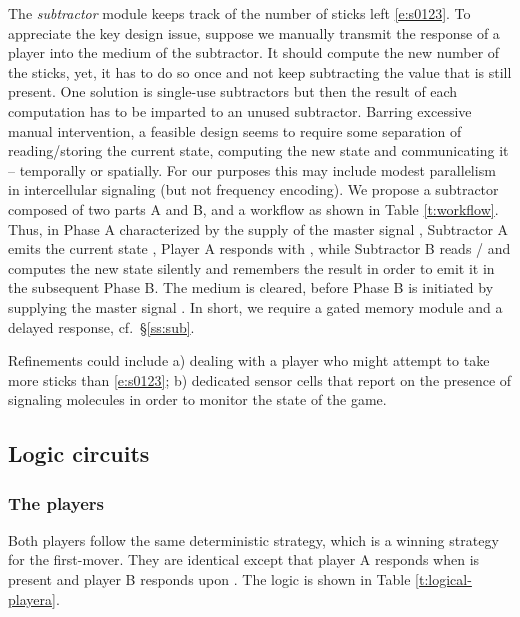 \documentclass[12pt,notitlepage]{article}
\begin{document}
The \emph{subtractor} module
keeps track of the number of sticks left \eqref{e:s0123}.
To appreciate the key design issue, suppose
we manually transmit the response 
of a player
into the medium of the subtractor.
It should compute the new number of the sticks,
yet, it has to do so once
and not keep subtracting the value 
that is still present.
One solution is single-use subtractors
but then the result of each computation
has to be imparted to an unused subtractor.
Barring excessive manual intervention,
a feasible design
seems to require some separation of
reading/storing the current state,
computing the new state and communicating it
--
temporally or spatially.
For our purposes
this may include
modest parallelism in intercellular signaling
(but not frequency encoding).
%
%
We propose 
a subtractor composed of two parts A and B,
and
a workflow 
as shown in Table \ref{t:workflow}.
%
%
%
Thus,
in Phase A characterized by the supply of 
the master signal ,
Subtractor A
emits the current state ,
Player A responds with ,
while
Subtractor B
reads /
and
computes the new state %
{silently}
and remembers the result
in order to emit it in the subsequent Phase B.
%
The medium is cleared, before
Phase B is initiated by
supplying the master signal .
%
%
In short,
we require
a gated memory module and a delayed response,
cf.~\S\ref{ss:sub}.

%

Refinements could include
a)
dealing with
a player who might attempt
to take more sticks than \eqref{e:s0123};
b)
dedicated sensor cells 
that report 
on the presence of signaling molecules 
in order to 
monitor the state of the game.

%





\subsection{Logic circuits}


\subsubsection*{The players} \label{ss:players}

Both players
follow the same deterministic strategy,
which is a winning strategy for the first-mover.
%
They are identical except
that player A responds when  is present
and player B responds upon .
%
The logic is shown in Table \ref{t:logical-playera}.
\end{document}

